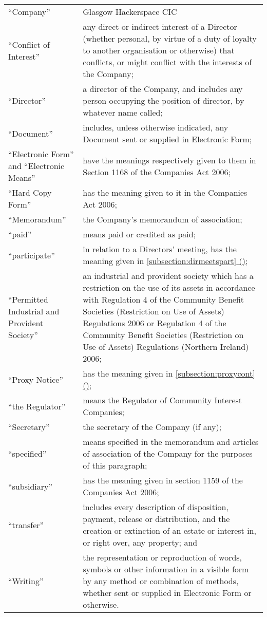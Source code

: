 \documentclass[12pt]{article}
\newcommand*{\fancyref}[1]{\hyperref[{#1}]{\autoref*{#1} (\nameref*{#1})}}
\begin{document}
\begin{longtable}[p]{ p{1.5in} p{30em} }
  ``Company'' & Glasgow Hackerspace CIC \\
  ``Conflict of Interest'' & any direct or indirect interest of a Director (whether personal, by virtue of a duty of loyalty to another organisation or otherwise) that conflicts, or might conflict with the interests of the Company; \\
  ``Director'' & a director of the Company, and includes any person occupying the position of director, by whatever name called; \\
  ``Document'' & includes, unless otherwise indicated, any Document sent or supplied in Electronic Form; \\
  ``Electronic Form'' and ``Electronic Means'' & have the meanings respectively given to them in Section 1168 of the Companies Act 2006; \\
  ``Hard Copy Form'' & has the meaning given to it in the Companies Act 2006; \\
  ``Memorandum'' & the Company’s memorandum of association; \\
  ``paid'' & means paid or credited as paid; \\
  ``participate'' & in relation to a Directors’ meeting, has the meaning given in \fancyref{subsection:dirmeetspart}; \\
  ``Permitted Industrial and Provident Society'' & an industrial and provident society which has a restriction on the use of its assets in accordance with Regulation 4 of the Community Benefit Societies (Restriction on Use of Assets) Regulations 2006 or Regulation 4 of the Community Benefit Societies (Restriction on Use of Assets) Regulations (Northern Ireland) 2006; \\
  ``Proxy Notice'' & has the meaning given in \fancyref{subsection:proxycont}; \\
  
  ``the Regulator'' & means the Regulator of Community Interest Companies; \\
  ``Secretary'' & the secretary of the Company (if any); \\
  ``specified'' & means specified in the memorandum and articles of association of the Company for the purposes of this paragraph; \\
  ``subsidiary'' & has the meaning given in section 1159 of the Companies Act 2006; \\
  ``transfer'' & includes every description of disposition, payment, release or distribution, and the creation or extinction of an estate or interest in, or right over, any property; and \\
  ``Writing'' & the representation or reproduction of words, symbols or other information in a visible form by any method or combination of methods, whether sent or supplied in Electronic Form or otherwise. \\  
\end{longtable}
\end{document}
